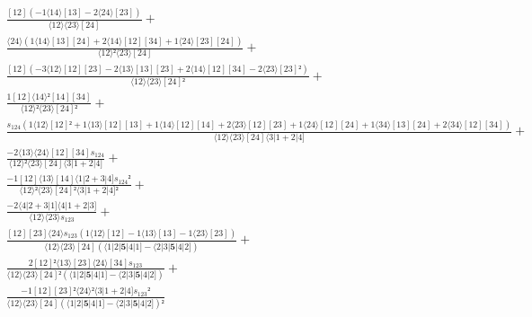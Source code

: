 \documentclass[varwidth, border=5pt]{standalone}
\begin{document}
\begin{my}
$\begin{gathered}
\scriptscriptstyle\frac{[12](-1⟨14⟩[13]-2⟨24⟩[23])}{⟨12⟩⟨23⟩[24]} +\\
\scriptscriptstyle\frac{⟨24⟩(1⟨14⟩[13][24]+2⟨14⟩[12][34]+1⟨24⟩[23][24])}{⟨12⟩²⟨23⟩[24]} +\\
\scriptscriptstyle\frac{[12](-3⟨12⟩[12][23]-2⟨13⟩[13][23]+2⟨14⟩[12][34]-2⟨23⟩[23]²)}{⟨12⟩⟨23⟩[24]²} +\\
\scriptscriptstyle\frac{1[12]⟨14⟩²[14][34]}{⟨12⟩²⟨23⟩[24]²} +\\
\scriptscriptstyle\frac{s_{124}(1⟨12⟩[12]²+1⟨13⟩[12][13]+1⟨14⟩[12][14]+2⟨23⟩[12][23]+1⟨24⟩[12][24]+1⟨34⟩[13][24]+2⟨34⟩[12][34])}{⟨12⟩⟨23⟩[24]⟨3|1+2|4]} +\\
\scriptscriptstyle\frac{-2⟨13⟩⟨24⟩[12][34]s_{124}}{⟨12⟩²⟨23⟩[24]⟨3|1+2|4]} +\\
\scriptscriptstyle\frac{-1[12]⟨13⟩[14]⟨1|2+3|4]s_{124}²}{⟨12⟩²⟨23⟩[24]²⟨3|1+2|4]²} +\\
\scriptscriptstyle\frac{-2⟨4|2+3|1]⟨4|1+2|3]}{⟨12⟩⟨23⟩s_{123}} +\\
\scriptscriptstyle\frac{[12][23]⟨24⟩s_{123}(1⟨12⟩[12]-1⟨13⟩[13]-1⟨23⟩[23])}{⟨12⟩⟨23⟩[24](⟨1|2|𝟓|4|1]-⟨2|3|𝟓|4|2])} +\\
\scriptscriptstyle\frac{2[12]²⟨13⟩[23]⟨24⟩[34]s_{123}}{⟨12⟩⟨23⟩[24]²(⟨1|2|𝟓|4|1]-⟨2|3|𝟓|4|2])} +\\
\scriptscriptstyle\frac{-1[12][23]²⟨24⟩²⟨3|1+2|4]s_{123}²}{⟨12⟩⟨23⟩[24](⟨1|2|𝟓|4|1]-⟨2|3|𝟓|4|2])²} \phantom{+}
\end{gathered}$
\end{my}
\end{document}

